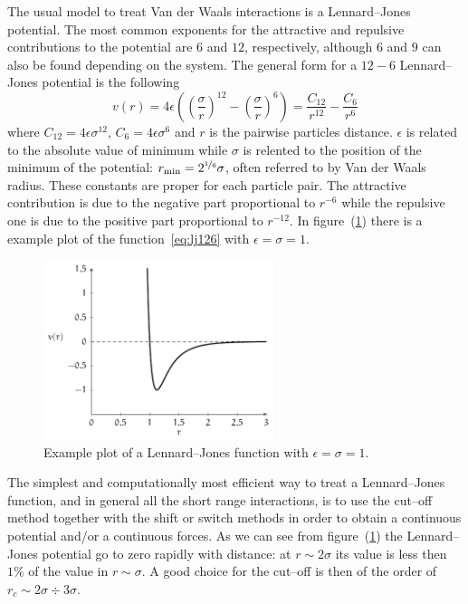 The usual model to treat Van der Waals interactions is a Lennard--Jones potential. The most common exponents for the attractive and repulsive contributions to the potential are $6$ and $12$, respectively, although $6$ and $9$ can also be found depending on the system. The general form for a $12-6$ Lennard--Jones potential is the following
\begin{equation}
	v(r) = 4\epsilon\left ( \left ( \frac{\sigma}{r}\right )^{12}  - \left ( \frac{\sigma}{r} \right )^6 \right ) = \frac{C_{12}}{r^{12}} - \frac{C_{6}}{r^{6}}
	\label{eq:lj126}
\end{equation}
where $C_{12} = 4\epsilon\sigma^{12}$, $C_{6} = 4\epsilon\sigma^{6}$ and $r$ is the pairwise particles distance. $\epsilon$ is related to the absolute value of minimum while $\sigma$ is relented to the position of the minimum of the potential: $r_{\text{min}} = 2^{\nicefrac{1}{6}}\sigma$, often referred to by Van der Waals radius. These constants are proper for each particle pair. The attractive contribution is due to the negative part proportional to $r^{-6}$ while the repulsive one is due to the positive part proportional to $r^{-12}$. In figure~(\ref{fig:LG12511}) there is a example plot of the function~\eqref{eq:lj126} with $\epsilon = \sigma = 1$.
\begin{figure}[!ht]
\centering
	\includegraphics[width=0.6\textwidth]{./img/LJ126/LJ126}
	\caption{Example plot of a Lennard--Jones function with $\epsilon = \sigma = 1$.}
	\label{fig:LG12511}
\end{figure}

The simplest and computationally most efficient way to treat a Lennard--Jones function, and in general all the short range interactions, is to use the cut--off method together with the shift or switch methods in order to obtain a continuous potential and/or a continuous forces. As we can see from figure~(\ref{fig:LG12511}) the Lennard--Jones potential go to zero rapidly with distance: at $r \sim 2\sigma$ its value is less then $1\%$ of the value in $r \sim \sigma$. A good choice for the cut--off is then of the order of $r_c \sim 2\sigma \div 3\sigma$.


